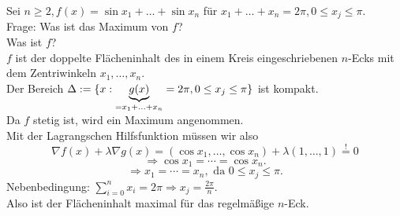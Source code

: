 \documentclass[../ana2u.tex]{subfiles}
\begin{document}
\begin{bsp}
    Sei \(n \geq 2, f(x) = \sin x_1 + \ldots + \sin x_n\) für 
    \(x_1 + \ldots + x_n = 2\pi, 0 \leq x_j \leq \pi\).\\
    Frage: Was ist das Maximum von \(f\)?\\ 
    Was ist \(f\)?\\
    \(f\) ist der doppelte Flächeninhalt des in einem Kreis eingeschriebenen 
    \(n\)-Ecks mit dem Zentriwinkeln \(x_1,\ldots, x_n\).\\
    Der Bereich 
    \( \Delta := \{ x : \underbrace{g(x)}_{=x_1 + \ldots + x_n} = 2\pi, 0 \leq x_j \leq \pi \} \) 
    ist kompakt. \\
    Da \(f\) stetig ist, wird ein Maximum angenommen.\\
    Mit der Lagrangschen Hilfsfunktion müssen wir also 
    \[ \nabla f(x) + \lambda\nabla g(x) 
    = (\cos x_1, \ldots, \cos x_n) + \lambda (1, \ldots, 1) \overset{!}{=} 0 \]
    \[ \Rightarrow \cos x_1 = \cdots = \cos x_n. \]
    \[ \Rightarrow x_1 = \cdots = x_n, \text{ da } 0 \leq x_j \leq \pi. \]
    Nebenbedingung: \(\sum_{i=0}^n x_i = 2\pi \Rightarrow x_j = \frac{2\pi}{n}\).\\
    Also ist der Flächeninhalt maximal für das regelmäßige \(n\)-Eck.
\end{bsp}
\end{document}
